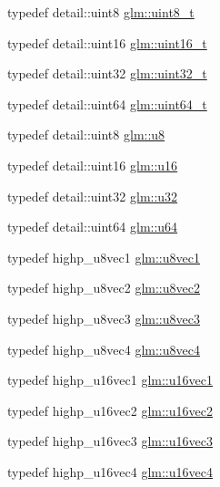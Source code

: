 \begin{DoxyCompactItemize}
\item 
typedef detail\-::uint8 \hyperlink{group__gtc__type__precision_ga93adf6dd9803408f3e3aaf9dedda352b}{glm\-::uint8\-\_\-t}
\item 
typedef detail\-::uint16 \hyperlink{group__gtc__type__precision_gac4eb4f43cae8129b00086dc234d3b8fc}{glm\-::uint16\-\_\-t}
\item 
typedef detail\-::uint32 \hyperlink{group__gtc__type__precision_ga822ca53a9ad412504532838906276a99}{glm\-::uint32\-\_\-t}
\item 
typedef detail\-::uint64 \hyperlink{group__gtc__type__precision_ga058f57c19e1befdcf12498944bd73e69}{glm\-::uint64\-\_\-t}
\item 
typedef detail\-::uint8 \hyperlink{group__gtc__type__precision_ga5e3dc67373d5068997d2d9f41c9024d2}{glm\-::u8}
\item 
typedef detail\-::uint16 \hyperlink{group__gtc__type__precision_gae7a1571503f83d2264ddfa705a6b082a}{glm\-::u16}
\item 
typedef detail\-::uint32 \hyperlink{group__gtc__type__precision_ga54e837745059fd29017bed71cfa0a8db}{glm\-::u32}
\item 
typedef detail\-::uint64 \hyperlink{group__gtc__type__precision_ga71cedd4972f9cb1a5e14dfe5ab83ecd7}{glm\-::u64}
\item 
typedef highp\-\_\-u8vec1 \hyperlink{group__gtc__type__precision_ga024be724ff45865952190522b03fc0d5}{glm\-::u8vec1}
\item 
typedef highp\-\_\-u8vec2 \hyperlink{group__gtc__type__precision_ga1c259b876f8757eb197b83a5fab476f0}{glm\-::u8vec2}
\item 
typedef highp\-\_\-u8vec3 \hyperlink{group__gtc__type__precision_ga8262aeb120701de1b57773eb10be0f35}{glm\-::u8vec3}
\item 
typedef highp\-\_\-u8vec4 \hyperlink{group__gtc__type__precision_gaf3c840b8a90a194559121504ba599197}{glm\-::u8vec4}
\item 
typedef highp\-\_\-u16vec1 \hyperlink{group__gtc__type__precision_ga809cb55e5fed3456686aae96e7e8684c}{glm\-::u16vec1}
\item 
typedef highp\-\_\-u16vec2 \hyperlink{group__gtc__type__precision_ga10e8900b9610f930772aa55aee8e3121}{glm\-::u16vec2}
\item 
typedef highp\-\_\-u16vec3 \hyperlink{group__gtc__type__precision_ga947d0d003e016eaf2038d6843b427257}{glm\-::u16vec3}
\item 
typedef highp\-\_\-u16vec4 \hyperlink{group__gtc__type__precision_ga87d1f39c523b4d6d4de0c2778afe5474}{glm\-::u16vec4}

\end{DoxyCompactItemize}
